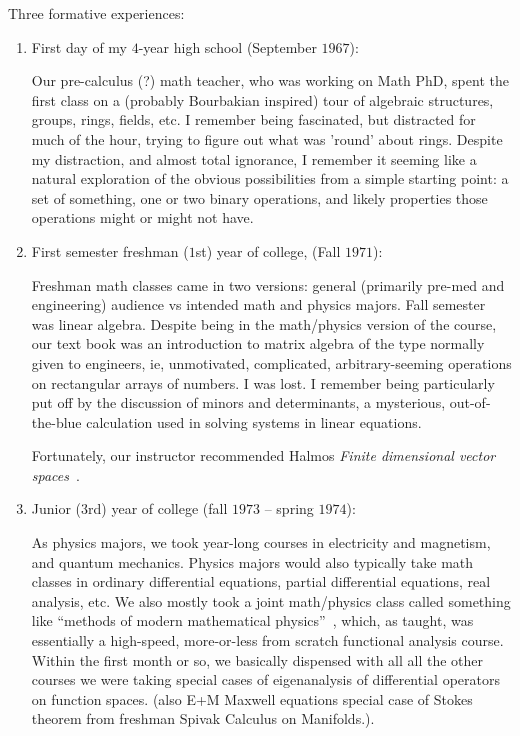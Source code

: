 \documentclass[11pt,openany]{book}
\begin{document}
Three formative experiences:
\begin{enumerate}
  \item First day of my $4$-year high school (September $1967$):
  \par
  Our pre-calculus (?) math teacher, who was working on Math PhD,
  spent the first class on a (probably Bourbakian inspired) tour 
  of algebraic structures, groups, rings, fields, etc.
  I remember being fascinated, but distracted for much of the hour, 
  trying to figure out what was 'round' about rings.
  Despite my distraction, and almost total ignorance, 
  I remember it seeming like a natural exploration of the obvious
  possibilities from a simple starting point: a set of something,
  one or two binary operations, and likely properties those
  operations might or might not have.
 
  \item First semester freshman ($1$st) year of college,
  (Fall $1971$):
  \par
  Freshman math classes came in two versions: 
  general (primarily pre-med and engineering) audience
  vs intended math and physics majors. Fall semester was linear 
  algebra. Despite being in the math/physics version of the course,
  our text book was an introduction to matrix algebra of the type
  normally given to engineers, ie, unmotivated, complicated,
  arbitrary-seeming operations on rectangular arrays of numbers.
  I was lost. I remember being particularly put off by the 
  discussion of minors and determinants, a mysterious, 
  out-of-the-blue calculation used in solving systems in linear
  equations.
  \par
  Fortunately, our instructor recommended 
  Halmos \emph{Finite dimensional vector 
  spaces}~\cite{Halmos:1958:Finite}. 
  
  \item Junior ($3$rd) year of college 
  (fall $1973$ -- spring $1974$):
  \par
  As physics majors, we took year-long courses in 
  electricity and magnetism, and quantum mechanics.
  Physics majors would also typically take math classes in
  ordinary differential equations, partial differential equations,
  real analysis, etc. We also mostly took a joint math/physics
  class called something like ``methods of modern mathematical 
  physics''~\cite{Reed:Simon:1972:FunctionalAnalysis}, 
  which, as taught, was essentially a high-speed,
  more-or-less from scratch functional analysis course.
  Within the first month or so, we basically dispensed with all
  all the other courses we were taking special cases of 
  eigenanalysis of differential operators on function spaces.
  (also E+M Maxwell equations special case of Stokes theorem 
  from freshman Spivak Calculus on Manifolds.).
  
\end{enumerate}
\end{document}
